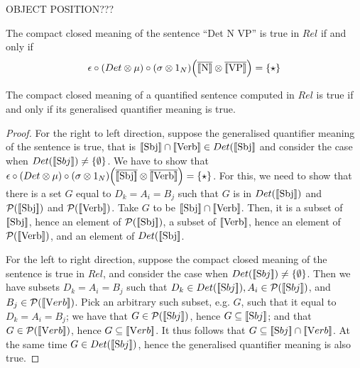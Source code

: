 OBJECT POSITION???

\begin{definition}
\label{deftrue}
The compact closed meaning of the sentence ``Det N VP'' is true  in $Rel$ if and only if 
\[
\epsilon \circ (Det \otimes \mu) \circ (\sigma \otimes 1_N) \Big(\overline{[\![ \text{N} ]\!]} \otimes \overline{[\![ \text{VP} ]\!]} \Big) = \{\star\} 
\] 
\end{definition}


\begin{proposition}
The  compact closed meaning of a quantified sentence computed in $Rel$ is true if and only if  its generalised quantifier meaning is true.
\end{proposition}

\begin{proof}
For the right to left direction,  suppose  the generalised quantifier meaning of the sentence is true, that is $[\![ \text{Sbj} ]\!] \cap [\![ \text{Verb} ]\!] \in Det([\![ \text{Sbj} ]\!]$ and consider the case when  $Det([\![ \text Sbj ]\!]) \neq \{\emptyset\}$. We have to show that $\epsilon \circ (Det \otimes \mu) \circ (\sigma \otimes 1_N) \Big(\overline{[\![ \text{Sbj} ]\!]} \otimes \overline{[\![ \text{Verb} ]\!]} \Big) = \{\star\}$.  For this, we need to show that there is a set $G$ equal to $D_k= A_i = B_j$ such that $G$ is in $Det([\![ \text{Sbj} ]\!])$ and $ {\cal P} ([\![ \text{Sbj} ]\!])$ and  ${\cal P} ([\![ \text{Verb} ]\!])$.  Take $G$ to be $[\![ \text{Sbj} ]\!] \cap [\![ \text{Verb} ]\!]$.  Then, it is a subset of   $[\![ \text{Sbj} ]\!]$, hence an element of  $ {\cal P} ([\![ \text{Sbj} ]\!])$, a subset of  $ [\![ \text{Verb} ]\!]$, hence an element of $ {\cal P} ([\![ \text{Verb} ]\!])$, and an element of $Det([\![ \text{Sbj} ]\!]$. 


For the left to right direction, suppose the compact closed meaning of the sentence is true in $Rel$, and consider  the case when $Det([\![ \text Sbj ]\!]) \neq \{\emptyset\}$. Then  we have  subsets $D_k = A_i = B_j$ such that $D_k \in Det([\![ \text Sbj ]\!]), A_i \in {\cal P}([\![ \text Sbj ]\!])$, and $B_j \in {\cal P}([\![ \text Verb ]\!])$.  Pick an arbitrary such subset, e.g.  $G$, such that it   equal to  $D_k = A_i = B_j$; we have that $G \in   {\cal P}([\![ \text Sbj ]\!])$, hence $G \subseteq [\![ \text Sbj ]\!]$; and that $G \in  {\cal P}([\![ \text Verb ]\!])$, hence $G \subseteq [\![ \text Verb ]\!]$. It thus follows that $G \subseteq [\![ \text Sbj ]\!]  \cap [\![ \text Verb ]\!]$. At the same time $G \in Det([\![ \text Sbj ]\!])$, hence the generalised quantifier meaning is also true.  


\end{proof}
